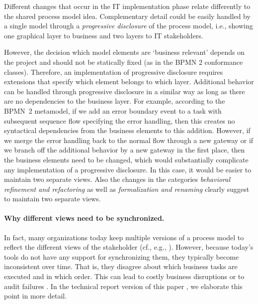 Different changes that occur in the IT implementation phase relate differently to the shared process model idea.
Complementary detail could be easily handled by a single model through a \emph{progressive disclosure} of the process model, i.e., showing one graphical layer to business and two layers to IT stakeholders. 

However, the decision which model elements are `business relevant' depends on the project and should not be statically fixed (as in the BPMN 2 conformance classes). Therefore, an implementation of progressive disclosure requires extensions that specify which element belongs to which layer. Additional behavior can be handled through progressive disclosure in a similar way as long as there are no dependencies to the business layer. For example, according to the BPMN~2 metamodel, if we add an error boundary event to a task with subsequent sequence flow specifying the error handling, then this creates no syntactical dependencies from the business elements to this addition. However, if we merge the error handling back to the normal flow through a new gateway or if we branch off the additional behavior by a new gateway in the first place, then the business elements need to be changed, which would substantially complicate any implementation of a progressive disclosure. 
In this case, it would be easier to maintain two separate views. Also the changes in the categories \emph{behavioral refinement and refactoring} as well as \emph{formalization and renaming} clearly suggest to maintain two separate views.




\paragraph{Why different views need to be synchronized.}

In fact, many organizations today keep multiple versions of a process model to reflect the different views of the stakeholder (cf., e.g., \cite{BXC+12,Tran08,WeidlichBMW09}). However, because today's tools do not have any support for synchronizing them, they typically become inconsistent over time. That is, they disagree about which business tasks are executed and in which order. This can lead to costly business disruptions or to audit failures \cite{BXC+12}. In the technical report version of this paper \cite{KVF+TR}, we elaborate this point in more detail.

